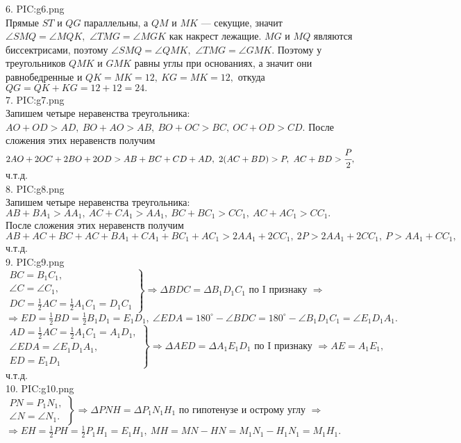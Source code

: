 6. {{PIC:g6.png}}\\
Прямые $ST$ и $QG$ параллельны, а $QM$ и $MK$ --- секущие, значит $\angle SMQ = \angle MQK,$  $\angle TMG= \angle MGK$ как накрест лежащие. $MG$ и $MQ$ являются биссектрисами, поэтому $\angle SMQ = \angle QMK,$ $ \angle TMG= \angle GMK.$ Поэтому у треугольников $QMK$ и $GMK$ равны углы при основаниях, а значит они равнобедренные и $QK=MK=12,\ KG=MK=12,$ откуда $QG=QK+KG=12+12=24.$\\
7. {{PIC:g7.png}}\\
Запишем четыре неравенства треугольника: $AO+OD>AD,\ BO+AO>AB,\ BO+OC>BC,\ OC+OD>CD.$ После сложения этих неравенств получим $2AO+2OC+2BO+2OD>AB+BC+CD+AD,\ 2(AC+BD)>P,\ AC+BD>\cfrac{P}{2},$ ч.т.д.\\
8. {{PIC:g8.png}}\\
Запишем четыре неравенства треугольника: $AB+BA_1>AA_1,\ AC+CA_1>AA_1,\ BC+BC_1>CC_1,\ AC+AC_1>CC_1.$ После сложения этих неравенств получим
$AB+AC+BC+AC+BA_1+CA_1+BC_1+AC_1>2AA_1+2CC_1,\ 2P>2AA_1+2CC_1,\ P>AA_1+CC_1,$ ч.т.д.\\
9. {{PIC:g9.png}}\\
$\left.\begin{array}{l}BC=B_1C_1,\\
\angle C=\angle C_1,\\
DC=\frac{1}{2}AC=\frac{1}{2}A_1C_1=D_1C_1  \end{array}\right\}\Rightarrow
\Delta BDC=\Delta B_1D_1C_1\text{ по I признаку }\Rightarrow $\\$\Rightarrow ED=\frac{1}{2}BD=\frac{1}{2}B_1D_1=E_1D_1,\ \angle EDA=180^\circ-\angle BDC=180^\circ-\angle B_1D_1C_1=\angle E_1D_1A_1.$\\
$\left.\begin{array}{l}AD=\frac{1}{2}AC=\frac{1}{2}A_1C_1=A_1D_1,\\
\angle EDA=\angle E_1D_1A_1,\\
ED=E_1D_1  \end{array}\right\}\Rightarrow \Delta AED=\Delta A_1E_1D_1\text{ по I признаку }\Rightarrow AE=A_1E_1,$ ч.т.д.\\
10. {{PIC:g10.png}}\\
$\left.\begin{array}{l}PN=P_1N_1,\\
\angle N=\angle N_1. \end{array}\right\}\Rightarrow
\Delta PNH=\Delta P_1N_1H_1\text{ по гипотенузе и острому углу }\Rightarrow $\\$\Rightarrow EH=\frac{1}{2}PH=\frac{1}{2}P_1H_1=E_1H_1,\ MH=MN-HN=M_1N_1-H_1N_1=M_1H_1.$\\
